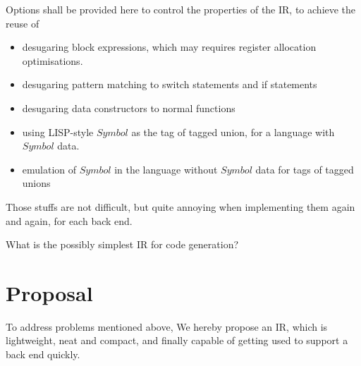 \documentclass[a1,portrait]{a1poster}
\begin{document}
\begin{multicols}{2}
Options shall be provided here to control the properties of the IR, to achieve the reuse of
\begin{itemize}
    \setlength\itemsep{-0.2em}
    \item desugaring block expressions, which may requires register allocation optimisations.
    \item  desugaring pattern matching to switch statements and if statements
    \item  desugaring data constructors to normal functions
    \item  using LISP-style $Symbol$ as the tag of tagged union, for a language with $Symbol$ data.
    \item  emulation of $Symbol$ in the language without $Symbol$ data for tags of tagged unions
\end{itemize}

Those stuffs are not difficult, but quite annoying when implementing
them again and again, for each back end.

What is the possibly simplest IR for code generation?

\section*{Proposal}

To address problems mentioned above, We hereby propose an IR,
which is lightweight, neat and compact, and finally capable of
getting used to support a back end quickly.

\vspace{-1.5cm}
\begin{multicols}{2}

\begin{minipage}[t]{0.8\linewidth}
\begin{bnf*}
    \\
    \\
    \\
    \\
    \\
\end{bnf*}
\end{minipage}


\end{multicols}
\end{multicols}
\end{document}
